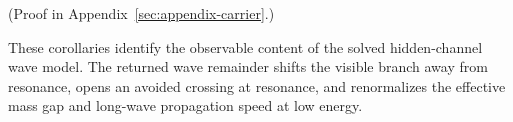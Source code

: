 (Proof in Appendix~\ref{sec:appendix-carrier}.)

These corollaries identify the observable content of the solved hidden-channel
wave model. The returned wave remainder shifts the visible branch away from
resonance, opens an avoided crossing at resonance, and renormalizes the
effective mass gap and long-wave propagation speed at low energy.
